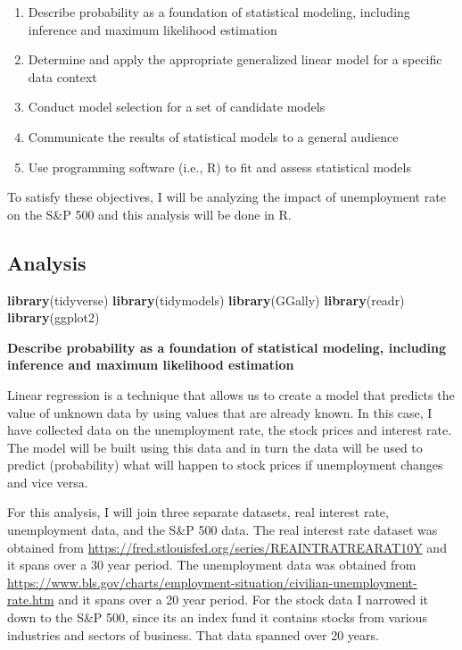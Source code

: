 \documentclass[
]{article}
\newenvironment{Shaded}{\begin{snugshade}}{\end{snugshade}}
\newcommand{\FunctionTok}[1]{\textcolor[rgb]{0.13,0.29,0.53}{\textbf{#1}}}
\newcommand{\NormalTok}[1]{#1}
\begin{document}
\begin{enumerate}
\def\labelenumi{\arabic{enumi}.}
\item
  Describe probability as a foundation of statistical modeling,
  including inference and maximum likelihood estimation
\item
  Determine and apply the appropriate generalized linear model for a
  specific data context
\item
  Conduct model selection for a set of candidate models
\item
  Communicate the results of statistical models to a general audience
\item
  Use programming software (i.e., R) to fit and assess statistical
  models
\end{enumerate}

To satisfy these objectives, I will be analyzing the impact of
unemployment rate on the S\&P 500 and this analysis will be done in R.

\hypertarget{analysis}{%
\subsection{Analysis}\label{analysis}}

\begin{Shaded}
\begin{Highlighting}[]
\FunctionTok{library}\NormalTok{(tidyverse)}
\FunctionTok{library}\NormalTok{(tidymodels)}
\FunctionTok{library}\NormalTok{(GGally)}
\FunctionTok{library}\NormalTok{(readr)}
\FunctionTok{library}\NormalTok{(ggplot2)}
\end{Highlighting}
\end{Shaded}

\textbf{Describe probability as a foundation of statistical modeling,
including inference and maximum likelihood estimation}

Linear regression is a technique that allows us to create a model that
predicts the value of unknown data by using values that are already
known. In this case, I have collected data on the unemployment rate, the
stock prices and interest rate. The model will be built using this data
and in turn the data will be used to predict (probability) what will
happen to stock prices if unemployment changes and vice versa.

For this analysis, I will join three separate datasets, real interest
rate, unemployment data, and the S\&P 500 data. The real interest rate
dataset was obtained from
\url{https://fred.stlouisfed.org/series/REAINTRATREARAT10Y} and it spans
over a 30 year period. The unemployment data was obtained from
\url{https://www.bls.gov/charts/employment-situation/civilian-unemployment-rate.htm}
and it spans over a 20 year period. For the stock data I narrowed it
down to the S\&P 500, since its an index fund it contains stocks from
various industries and sectors of business. That data spanned over 20
years.
\end{document}
